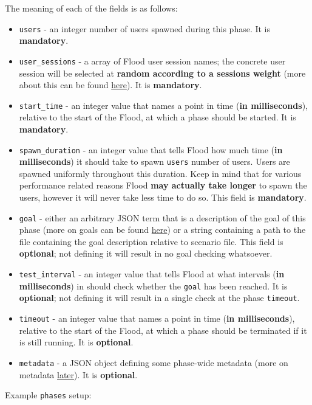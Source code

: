 \documentclass[a4paper]{article}
\begin{document}
\noindent
The meaning of each of the fields is as follows:


\begin{itemize}
\item \texttt{users} - an integer number of users spawned during this phase. It is \textbf{mandatory}.
\item \texttt{user\_sessions} - a array of Flood user session names; the concrete user session will be selected at \textbf{random according to a sessions weight} (more about this can be found \hyperref[sec-2-2]{here}). It is \textbf{mandatory}.
\item \texttt{start\_time} - an integer value that names a point in time (\textbf{in milliseconds}), relative to the start of the Flood, at which a phase should be started. It is \textbf{mandatory}.
\item \texttt{spawn\_duration} - an integer value that tells Flood how much time (\textbf{in milliseconds}) it should take to spawn \texttt{users} number of users. Users are spawned uniformly throughout this duration. Keep in mind that for various performance related reasons Flood \textbf{may actually take longer} to spawn the users, however it will never take less time to do so. This field is \textbf{mandatory}.
\item \texttt{goal} - either an arbitrary JSON term that is a description of the goal of this phase (more on goals can be found \hyperref[sec-2-3]{here}) or a string containing a path to the file containing the goal description relative to scenario file. This field is \textbf{optional}; not defining it will result in no goal checking whatsoever.
\item \texttt{test\_interval} - an integer value that tells Flood at what intervals (\textbf{in milliseconds}) in should check whether the \texttt{goal} has been reached. It is \textbf{optional}; not defining it will result in a single check at the phase \texttt{timeout}.
\item \texttt{timeout} - an integer value that names a point in time (\textbf{in milliseconds}), relative to the start of the Flood, at which a phase should be terminated if it is still running. It is \textbf{optional}.
\item \texttt{metadata} - a JSON object defining some phase-wide metadata (more on metadata \hyperref[sec-3-6]{later}). It is \textbf{optional}.
\end{itemize}

\noindent
Example \texttt{phases} setup:
\end{document}
